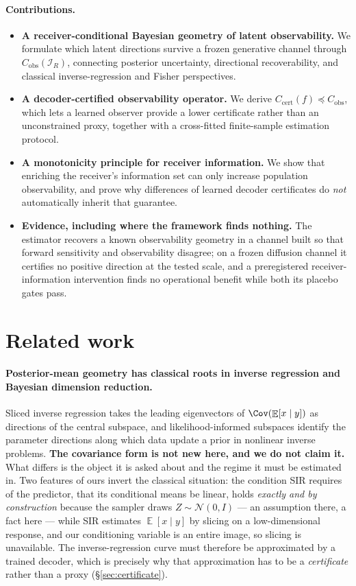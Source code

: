 \documentclass{article}
\theoremstyle{definition}
\DeclareMathOperator{\Exp}{\mathbb{E}}
\newcommand{\Cobs}{C_{\mathrm{obs}}}
\newcommand{\Ccert}{C_{\mathrm{cert}}}
\begin{document}
\paragraph{Contributions.}
\begin{itemize}
  \item \textbf{A receiver-conditional Bayesian geometry of latent observability.} We
  formulate which latent directions survive a frozen generative channel through
  $\Cobs(\mathcal I_R)$, connecting posterior uncertainty, directional recoverability, and
  classical inverse-regression and Fisher perspectives.
  \item \textbf{A decoder-certified observability operator.} We derive
  $\Ccert(f)\preceq\Cobs$, which lets a learned observer provide a lower certificate
  rather than an unconstrained proxy, together with a cross-fitted finite-sample
  estimation protocol.
  \item \textbf{A monotonicity principle for receiver information.} We show that enriching
  the receiver's information set can only increase population observability, and prove why
  differences of learned decoder certificates do \emph{not} automatically inherit that
  guarantee.
  \item \textbf{Evidence, including where the framework finds nothing.} The estimator
  recovers a known observability geometry in a channel built so that forward sensitivity
  and observability disagree; on a frozen diffusion channel it certifies no positive
  direction at the tested scale, and a preregistered receiver-information intervention
  finds no operational benefit while both its placebo gates pass.
\end{itemize}

\section{Related work}

\paragraph{Posterior-mean geometry has classical roots in inverse regression and Bayesian
dimension reduction.}
Sliced inverse regression \citep{li1991sir} takes the leading eigenvectors of
$\Cov(\Exp[x\mid y])$ as directions of the central subspace, and likelihood-informed
subspaces \citep{cui2014lis} identify the parameter directions along which data update a
prior in nonlinear inverse problems. \textbf{The covariance form is not new here, and we
do not claim it.} What differs is the object it is asked about and the regime it must be
estimated in. Two features of ours invert the classical situation: the condition SIR
requires of the predictor, that its conditional means be linear, holds \emph{exactly and
by construction} because the sampler draws $Z\sim\mathcal N(0,I)$ --- an assumption there,
a fact here --- while SIR estimates $\Exp[x\mid y]$ by slicing on a low-dimensional
response, and our conditioning variable is an entire image, so slicing is unavailable. The
inverse-regression curve must therefore be approximated by a trained decoder, which is
precisely why that approximation has to be a \emph{certificate} rather than a proxy
(\S\ref{sec:certificate}).
\end{document}
